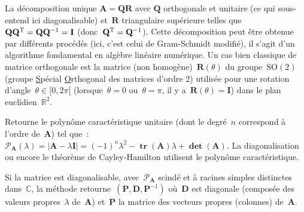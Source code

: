 \documentclass[11pt]{article}
\newcommand{\R}{\mathbf{\mathds{R}}}
\newcommand{\COMPLEX}{\mathbf{\mathds{C}}}
\newcommand{\mb}[1]{\mathbf{#1}}
\DeclareMathOperator*{\ddet}{\mathrm{\mathbf{det}}}
\DeclareMathOperator*{\ttra}{\mathrm{\mathbf{tr}}}
\let\mathds\mathbb
\begin{document}
\begin{description}[leftmargin=4cm, style=nextline]
\item[\texttt{QR()}] 
La d\'ecomposition unique $\mb{A} = \mb{Q}\mb{R}$ avec $\mb{Q}$ orthogonale et unitaire (ce qui sous-entend ici diagonalisable) et~$\mb{R}$ triangulaire sup\'erieure telles
que~$\mb{Q}\mb{Q}^{\textsc{T}}=\mb{Q}\mb{Q}^{-1}=\mb{I}$ (donc~$\mb{Q}^{\textsc{T}}=\mb{Q}^{-1}$). Cette d\'ecomposition peut \^etre obtenue par diff\'erents proc\'ed\'es
(ici, c'est celui de Gram-Schmidt modifi\'e), il s'agit d'un algorithme fondamental en alg\`ebre lin\'eaire num\'erique. Un cas bien classique de matrice orthogonale est la matrice
(non homog\`ene)~$\mb{R}(\theta)$ du groupe~$\text{SO}(2)$ (groupe \underline{S}p\'ecial \underline{O}rthogonal des matrices d'ordre 2) utilis\'ee pour une rotation
d'angle~$\theta\in[0,2\pi[$ (lorsque~$\theta=0$ ou~$\theta=\pi$, il y a~$\mb{R}(\theta)=\mb{I}$) dans le plan euclidien~$\R^{2}$.\\

\item[\texttt{characteristic\_polynomial()}] 
Retourne le polynôme caract\'eristique unitaire (dont le degr\'e~$n$ correspond \`a l'ordre de~$\mb{A}$) tel que~:\\$\mathcal{P}_{\mb{A}}(\lambda) = |\mb{A}-\lambda\mb{I}|= (-1)^{n}\lambda^2 - \ttra(\mb{A})\lambda + \ddet(\mb{A})$.
La diagonalisation ou encore le th\'eor\`eme de Cayley-Hamilton utilisent le polynôme caract\'eristique.\\

\item[\texttt{diagonalization()}] 
Si la matrice est diagonalisable, avec~$\mathcal{P}_{\mb{A}}$ scind\'e et \`a racines simples distinctes dans~$\COMPLEX$, la m\'ethode retourne~$(\mb{P}, \mb{D}, \mb{P}^{-1})$ où~$\mb{D}$ est diagonale (compos\'ee des valeurs propres~$\lambda$
de~$\mb{A}$) et~$\mb{P}$ la matrice des vecteurs propres (colonnes) de~$\mb{A}$.\\


\end{description}
\end{document}
